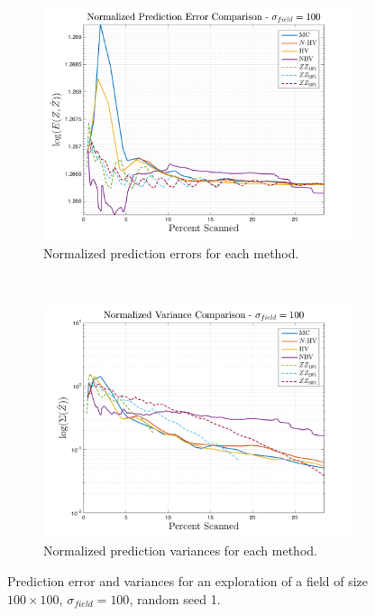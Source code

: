 \begin{figure}[htb!]
    \centering
    \begin{subfigure}[t]{0.75\textwidth}
        \centering
        \includegraphics[width=\linewidth]{figures/normalized_errors_30p_100x100_sf_100_seed_1_app_10}
        \captionsetup{skip=0.20\baselineskip,size=footnotesize}
        \caption{Normalized prediction errors for each method.}
    \end{subfigure}%
    \\
    \begin{subfigure}[t]{0.75\textwidth}
        \centering
        \includegraphics[width=\linewidth]{figures/normalized_variances_30p_100x100_sf_100_seed_1_app_10}
        \captionsetup{skip=0.20\baselineskip,size=footnotesize}
        \caption{Normalized prediction variances for each method.}
    \end{subfigure}%
    \captionsetup{skip=0.20\baselineskip}
    \caption{Prediction error and variances for an exploration of a field of size $100 \times 100$, $\sigma_{field} = 100$, random seed 1.}
    \label{fig:errvar100}
\end{figure}

